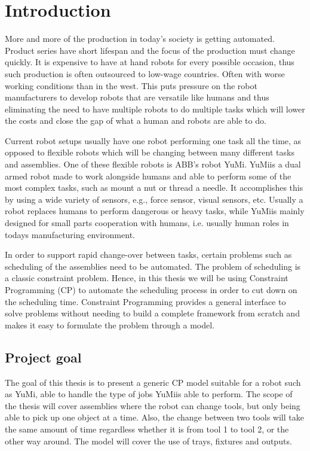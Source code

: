 \chapter{Introduction} 

More and more of the production in today's society is getting automated.
Product series have short lifespan and the focus of the production must change quickly. It is expensive to have at hand robots for every possible occasion, thus such production is often outsourced to low-wage countries. Often with worse working conditions than in the west. This puts pressure on the robot manufacturers to develop robots that are versatile like humans and thus eliminating the need to have multiple robots to do multiple tasks which will lower the costs and close the gap of what a human and robots are able to do.

Current robot setups usually have one robot performing one task all the time, as opposed to flexible robots which will be changing between many different tasks and assemblies. One of these flexible robots is ABB's robot YuMi\textsuperscript\textregistered. YuMi\textsuperscript\textregistered is a dual armed robot made to work alongside humans and able to perform some of the most complex tasks, such as mount a nut or thread a needle\cite{_yumi_}. It accomplishes this by using a wide variety of sensors, e.g., force sensor, visual sensors, etc. Usually a robot replaces humans to perform dangerous or heavy tasks, while YuMi\textsuperscript\textregistered is mainly designed for small parts cooperation with humans, i.e. usually human roles in todays manufacturing environment.

In order to support rapid change-over between tasks, certain problems such as scheduling of the assemblies need to be automated. The problem of scheduling is a classic constraint problem. Hence, in this thesis we will be using Constraint Programming (CP) to automate the scheduling process in order to cut down on the scheduling time. Constraint Programming provides a general interface to solve problems without needing to build a complete framework from scratch and makes it easy to formulate the problem through a model.

\newpage

\section{Project goal}
The goal of this thesis is to present a generic CP model suitable for a robot such as YuMi\textsuperscript\textregistered, able to handle the type of jobs YuMi\textsuperscript\textregistered is able to perform. The scope of the thesis will cover assemblies where the robot can change tools, but only being able to pick up one object at a time. Also, the change between two tools will take the same amount of time regardless whether it is from tool 1 to tool 2, or the other way around. The model will cover the use of trays, fixtures and outputs.

